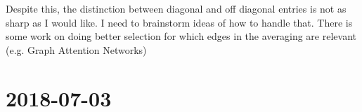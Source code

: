 \documentclass[a4paper]{article}
\newcommand{\DatestampYMD}[3]{\mbox{#1-#2-#3}}
\newcommand{\entry}[3]{\newpage\section*{\DatestampYMD{#1}{#2}{#3}} }
\begin{document}
\begin{figure}[H]
\begin{minipage}{.45\linewidth}
{            \label{fig:pairwise3inf_sub2}
        }
    \end{minipage}
    \centering
    \label{fig:pairwise3inf_plot}
\end{figure}
Despite this, the distinction between diagonal and off diagonal entries is not as sharp as I would like. I need to brainstorm ideas of how to handle that. There is some work on doing better selection for which edges in the averaging are relevant (e.g. Graph Attention Networks)

\entry{2018}{07}{03}
\end{document}

